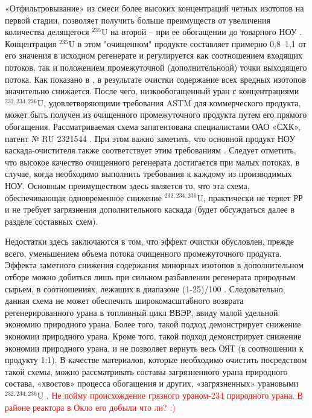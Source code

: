 «Отфильтровывание» из смеси более высоких концентраций четных изотопов на первой стадии, позволяет получить больше преимуществ от увеличения количества делящегося $^{235}$U на второй -- при ее обогащении до товарного НОУ \cite{palkinSeparationUraniumIsotopes2010}.
Концентрация $^{235}$U в этом "очищенном" продукте составляет примерно 0,8--1,1 от его значения в исходном регенерате и регулируется как соотношением входящих потоков, так и положением промежуточной (дополнительноой) точки выходящего потока.
Как показано в \cite{palkinSeparationUraniumIsotopes2010}, в результате очистки содержание всех вредных изотопов значительно снижается. После чего, низкообогащенный уран с концентрациями $^{232,234,236}$U, удовлетворяющими требования ASTM для коммерческого продукта, может быть получен из очищенного промежуточного продукта путем его прямого обогащения. Рассматриваемая схема запатентована специалистами ОАО «СХК», патент № RU 2321544 \cite{shopenSposobPolucheniyaRazbavitelya2008}.
При этом важно заметить, что основной продукт НОУ каскада-очистителя также соответствует этим требованиям \cite{palkinSeparationUraniumIsotopes2010}. Следует отметить, что высокое качество очищенного регенерата достигается при малых потоках, в случае, когда необходимо выполнить требования к каждому из производимых НОУ.
Основным преимуществом здесь является то, что эта схема, обеспечивающая одновременное снижение $^{232,234,236}$U, практически не теряет РР и не требует загрязнения дополнительного каскада (будет обсуждаться далее в разделе составных схем).

Недостатки здесь заключаются в том, что эффект очистки обусловлен, прежде всего, уменьшением объема потока очищенного промежуточного продукта. Эффекта заметного снижения содержания минорных изотопов в дополнительном отборе можно добиться лишь при сильном разбавлении регенерата природным сырьем, в соотношениях, лежащих в диапазоне (1-25)/100 \cite{palkinSeparationUraniumIsotopes2010, smirnovKaskadnyeShemyZadachah2012}. Следовательно, данная схема не может обеспечить широкомасштабного возврата регенерированного урана в топливный цикл ВВЭР, ввиду малой удельной экономию природного урана.  Более того, такой подход демонстрирует снижение экономии природного урана. Кроме того, такой подход демонстрирует снижение экономии природного урана, и не позволяет вернуть весь ОЯТ (в соотношении к продукту 1:1).
В качестве материалов, которые необходимо очистить посредством такой схемы, можно рассматривать составы загрязненного урана природного состава, «хвостов» процесса обогащения и других, «загрязненных» урановыми $^{232,234,236}$U \cite{palkinSeparationUraniumIsotopes2010}. 
\textcolor{red}{Не пойму происхождение грязного ураном-234 природного урана. В районе реактора в Окло его добыли что ли? :)}


